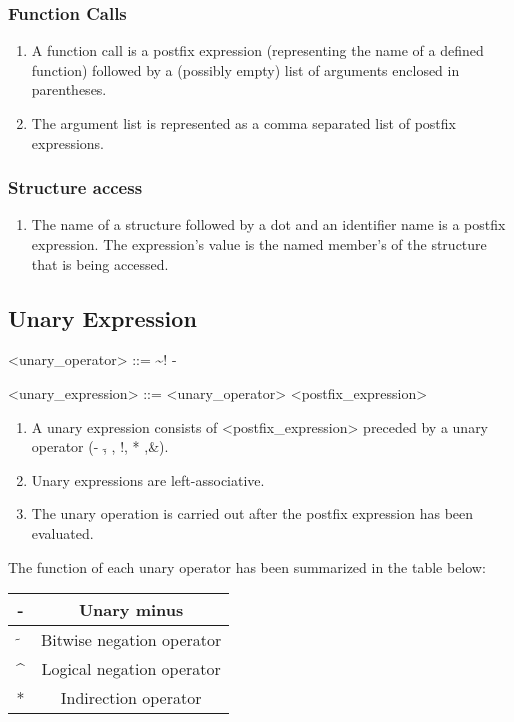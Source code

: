 \subsubsection{Function Calls}
\begin{enumerate}
	\item A function call is a postfix expression (representing the name of a defined function) followed by a (possibly empty) list of arguments enclosed in parentheses.
	\item The argument list is represented as a comma separated list of postfix expressions.
\end{enumerate}

\subsubsection{Structure access}
\begin{enumerate}
	\item The name of a structure followed by a dot and an identifier name is a postfix expression. The expression's value is the named member's of the structure that is being accessed.
\end{enumerate}

\subsection{Unary Expression}
\begin{grammar}
	<unary_operator> ::= \~
	\alt !
	\alt -
	\alt *
	
	<unary_expression> ::= <unary_operator> <postfix_expression>
\end{grammar}
\begin{enumerate}
	\item A unary expression consists of <postfix_expression> preceded by a unary operator (-   ,$\tilde{}$ , !, * ,\&).
	\item Unary expressions are left-associative.
	\item The unary operation is carried out after the postfix expression has been evaluated.
\end{enumerate}



The function of each unary operator has been summarized in the table below:
\begin{center}
\begin{tabular}{ | c | c | } 
\hline
- & Unary minus\\
\hline
$\tilde{}$ & Bitwise negation operator\\
\hline
\textasciicircum{} & Logical negation operator\\
\hline
* & Indirection operator\\
\hline
\end{tabular}
\end{center}

